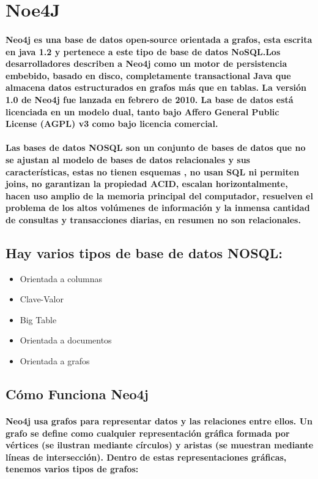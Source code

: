 \section{Noe4J}
\paragraph{Neo4j es una base de datos open-source orientada a grafos, esta escrita en java 1.2 y pertenece a este tipo de base de datos NoSQL.Los desarrolladores describen a Neo4j como un motor de persistencia embebido, basado en disco, completamente transactional Java que almacena datos estructurados en grafos más que en tablas. La versión 1.0 de Neo4j fue lanzada en febrero de 2010. La base de datos está licenciada en un modelo dual, tanto bajo Affero General Public License (AGPL) v3 como bajo licencia comercial.}
\paragraph{Las bases de datos NOSQL son un conjunto de bases de datos que no se ajustan al modelo de bases de datos relacionales y sus características, estas no tienen esquemas  , no usan SQL ni permiten joins, no garantizan la propiedad ACID,  escalan horizontalmente, hacen uso amplio de la memoria principal del computador, resuelven el problema de los altos volúmenes de información y la inmensa cantidad de consultas y transacciones diarias, en resumen no son relacionales.}
\subsection{Hay varios tipos de base de datos NOSQL:}
\begin{itemize}
	\item Orientada a columnas
	\item Clave-Valor
	\item Big Table
	\item Orientada a documentos
	\item Orientada a grafos
\end{itemize}
\subsection{Cómo Funciona Neo4j}
\paragraph{Neo4j usa grafos para representar datos y las relaciones entre ellos. Un grafo se define como cualquier representación gráfica formada por vértices (se ilustran mediante círculos) y aristas (se muestran mediante líneas de intersección). Dentro de estas representaciones gráficas, tenemos varios tipos de grafos:}
